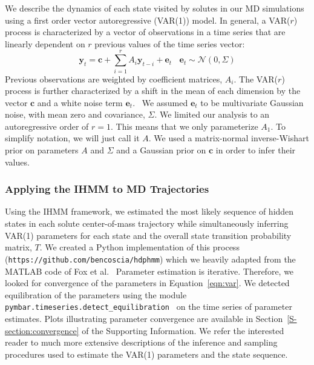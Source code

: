\documentclass[journal=jpcbfk,manuscript=article]{achemso}
\begin{document}
  We describe the dynamics of each state visited by solutes in our MD simulations using
  a first order vector autoregressive (VAR(1)) model. In general, a VAR($r$) process is characterized by a
  vector of observations in a time series that are linearly dependent on $r$ previous
  values of the time series vector:
  \begin{equation}
  	\mathbf{y}_t = \mathbf{c} + \sum_{i=1}^r A_i\mathbf{y}_{t-i} + \mathbf{e}_t~~~~\mathbf{e}_t \sim \mathcal{N}(0, \Sigma)
  \label{eqn:var}
  \end{equation}
  Previous observations are weighted by coefficient matrices, $A_i$. The VAR($r$) 
  process is further characterized by a shift in the mean of each dimension by the
  vector $\mathbf{c}$ and a white noise term $\mathbf{e}_t$.~\cite{hamilton_time_1994}
  We assumed $\mathbf{e}_t$ to be multivariate Gaussian noise, with mean zero and
  covariance, $\Sigma$. We limited our analysis to an autoregressive order of $r=1$.
  This means that we only parameterize $A_1$. To simplify notation, we will just
  call it $A$. We used a matrix-normal inverse-Wishart prior on parameters $A$ and 
  $\Sigma$ and a Gaussian prior on $\mathbf{c}$ in order to infer their 
  values.~\cite{fox_nonparametric_2009}
   
  \subsubsection*{Applying the IHMM to MD Trajectories} 
   
  Using the IHMM framework, we estimated the most likely sequence of hidden states in
  each solute center-of-mass trajectory while simultaneously inferring VAR(1)
  parameters for each state and the overall state transition probability matrix, $T$.
  We created a Python implementation of this process 
  (\texttt{https://github.com/bencoscia/hdphmm}) which we heavily adapted from
  the MATLAB code of Fox et al.~\cite{fox_bayesian_2010} Parameter estimation is iterative. 
  Therefore, we looked for convergence of the parameters in Equation~\ref{eqn:var}.
  We detected equilibration of the parameters using the module \texttt{pymbar.timeseries.detect\_equilibration}~\cite{chodera_simple_2016} 
  on the time series of parameter estimates. Plots illustrating parameter convergence are 
  available in Section~\ref{S-section:convergence} of the Supporting Information. We 
  refer the interested reader to much more extensive descriptions of the inference and 
  sampling procedures used to estimate the VAR(1) parameters and the state sequence. ~\cite{beal_infinite_2002,teh_hierarchical_2006,van_gael_beam_2008,fox_nonparametric_2009,fox_bayesian_2010}
  
\end{document}
